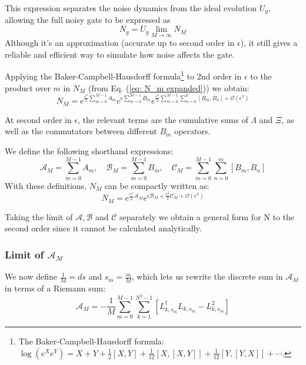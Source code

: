 \documentclass[9pt,a4paper,twocolumn,twoside]{tau-class/tau}
\begin{document}
This expression separates the noise dynamics from the ideal evolution $U_g$, allowing the full noisy gate to be expressed as 
\begin{equation}
    N_g = U_g \lim_{M \rightarrow \infty}  N_M
    \label{eq: N_M to infinity}
\end{equation}
Although it’s an approximation (accurate up to second order in $\epsilon$), it still gives a reliable and efficient way to simulate how noise affects the gate.

Applying the Baker-Campbell-Hausdorff formula\footnote{The Baker-Campbell-Hausdorff formula: 
\( \log(e^X e^Y) = X + Y + \frac{1}{2}[X,Y] + \frac{1}{12}[X,[X,Y]] + \frac{1}{12}[Y,[Y,X]] + \cdots \).} to 2nd order in $\epsilon$ to the product over $m$ in $N_M$ (from Eq. (\ref{eq: N_m expanded})) we obtain:
\begin{equation}
     N_M  = e^{\frac{\epsilon^2}{2} \sum_{m=0}^{M-1} A_m} e^{\epsilon \sum_{m=0}^{M-1} B_m}
     e^{ \frac{\epsilon^2}{2} \sum_{m=0}^{M-1} \sum_{n=0}^{k} [B_m, B_n] + \mathcal{O}(\epsilon^3)}
\end{equation}

At second order in $\epsilon$, the relevant terms are the cumulative sums of $\Lambda$ and $\Xi$, as well as the commutators between different $B_m$ operators.

We define the following shorthand expressions:
\begin{equation}
\mathcal{A}_M = \sum_{m=0}^{M-1} A_m, \quad 
\mathcal{B}_M = \sum_{m=0}^{M-1} B_m, \quad
\mathcal{C}_M = \sum_{m=0}^{M-1} \sum_{n=0}^{m} [B_m, B_n] 
\end{equation}
With these definitions, $N_M$ can be compactly written as:
\begin{equation}
     \label{eq: noisy gate N_M extended}
     N_M  = e^{\frac{\epsilon^2}{2} \mathcal{A}_M} e^{\epsilon \mathcal{B}_M + \frac{\epsilon^2}{2} \mathcal{C}_M + \mathcal{O}(\epsilon^3)}
\end{equation}

Taking the limit of $\mathcal{A}, \mathcal{B}$ and $\mathcal{C}$ separately we obtain a general form for N to the second order since it cannot be calculated analytically. 
\subsubsection*{Limit of $\mathcal{A_M}$}
We now define $\frac{1}{M} = ds$ and $s_m = \frac{m}{M}$, which lets us rewrite the discrete sum in $\mathcal{A}_M$ in terms of a Riemann sum:
\begin{equation}
    \mathcal{A}_M = -\frac{1}{M}\sum_{m=0}^{M-1} \sum_{k=1}^{N^2 - 1} \left[ L_{k,s_m}^\dagger L_{k,s_m} - L_{k,s_m}^2 \right]
\end{equation}
\end{document}
